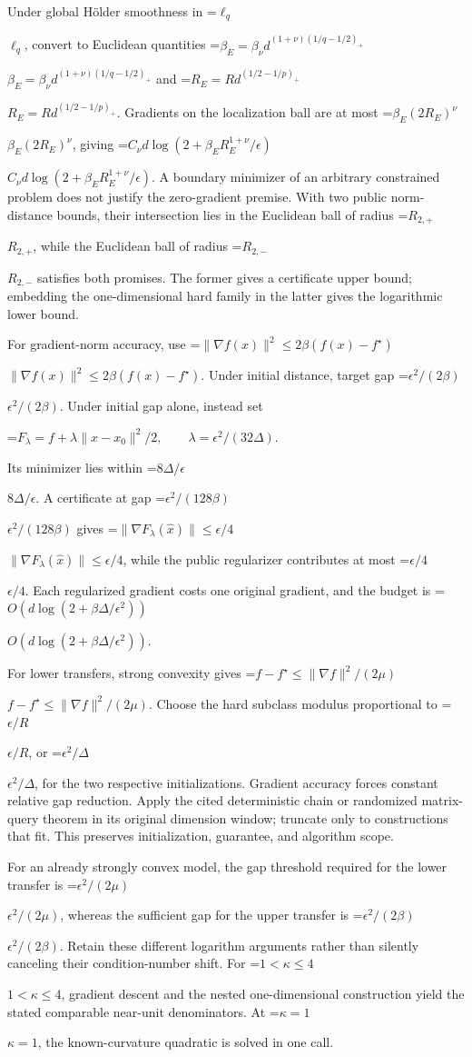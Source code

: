 \documentclass[10pt,a4paper]{article}
\newcommand{\AtlasMath}[1]{\par\begingroup\centering\setbox0=\hbox{$\displaystyle #1$}\ifdim\wd0>1.4\linewidth\typeout{ATLAS WIDE FORMULA: \the\wd0}\fi\ifdim\wd0>\linewidth\resizebox{\linewidth}{!}{\box0}\else\box0\fi\par\endgroup}
\newcommand{\AtlasInlineMath}[1]{\begingroup\setbox0=\hbox{$#1$}\ifdim\wd0>.4\linewidth\endgroup\AtlasMath{#1}\else\endgroup$#1$\fi}
\begin{document}
Under global Hölder smoothness in \AtlasInlineMath{\ell_q}, convert to Euclidean quantities
\AtlasInlineMath{\beta_E=\beta_\nu d^{(1+\nu)(1/q-1/2)_+}} and
\AtlasInlineMath{R_E=Rd^{(1/2-1/p)_+}}. Gradients on the localization ball are at most \AtlasInlineMath{\beta_E(2R_E)^\nu}, giving
\AtlasInlineMath{C_\nu d\log(2+\beta_E R_E^{1+\nu}/\epsilon)}.
A boundary minimizer of an arbitrary constrained problem does not justify the zero-gradient premise. With two public norm-distance bounds, their intersection lies in the Euclidean ball of radius \AtlasInlineMath{R_{2,+}}, while the Euclidean ball of radius \AtlasInlineMath{R_{2,-}} satisfies both promises. The former gives a certificate upper bound; embedding the one-dimensional hard family in the latter gives the logarithmic lower bound.

For gradient-norm accuracy, use \AtlasInlineMath{\|\nabla f(x)\|^2\le2\beta(f(x)-f^\star)}. Under initial distance, target gap \AtlasInlineMath{\epsilon^2/(2\beta)}. Under initial gap alone, instead set

\AtlasMath{F_\lambda=f+\lambda\|x-x_0\|^2/2,\qquad\lambda=\epsilon^2/(32\Delta).}

Its minimizer lies within \AtlasInlineMath{8\Delta/\epsilon}. A certificate at gap \AtlasInlineMath{\epsilon^2/(128\beta)} gives \AtlasInlineMath{\|\nabla F_\lambda(\widehat x)\|\le\epsilon/4}, while the public regularizer contributes at most \AtlasInlineMath{\epsilon/4}. Each regularized gradient costs one original gradient, and the budget is \AtlasInlineMath{O(d\log(2+\beta\Delta/\epsilon^2))}.

For lower transfers, strong convexity gives \AtlasInlineMath{f-f^\star\le\|\nabla f\|^2/(2\mu)}. Choose the hard subclass modulus proportional to \AtlasInlineMath{\epsilon/R}, or \AtlasInlineMath{\epsilon^2/\Delta}, for the two respective initializations. Gradient accuracy forces constant relative gap reduction. Apply the cited deterministic chain or randomized matrix-query theorem in its original dimension window; truncate only to constructions that fit. This preserves initialization, guarantee, and algorithm scope.

For an already strongly convex model, the gap threshold required for the lower transfer is \AtlasInlineMath{\epsilon^2/(2\mu)}, whereas the sufficient gap for the upper transfer is \AtlasInlineMath{\epsilon^2/(2\beta)}. Retain these different logarithm arguments rather than silently canceling their condition-number shift. For \AtlasInlineMath{1<\kappa\le4}, gradient descent and the nested one-dimensional construction yield the stated comparable near-unit denominators. At \AtlasInlineMath{\kappa=1}, the known-curvature quadratic is solved in one call.
\end{document}
